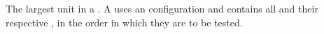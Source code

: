 
\item[\gdsuite]{
The largest unit in a  \jb{} \gdproject{}. 
 A \gdsuite uses an \gdaut configuration and contains all \gdcases and their respective \gdsteps, in the order in which they are to be tested.
}
